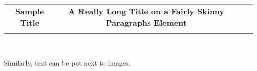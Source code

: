 \documentclass[10pt,]{article}
\theoremstyle{plain}
\theoremstyle{definition}
\theoremstyle{definition}
\theoremstyle{definition}
\theoremstyle{definition}
\theoremstyle{definition}
\theoremstyle{definition}
\numberwithin{equation}{section}
\newlength{\panelmax}
\begin{document}
{\setlength{\tabcolsep}{0.025\linewidth}
\par\medskip\noindent
\hspace*{0.025\linewidth}%
\begin{tabular}{@{}*{4}{c}@{}}
\parbox[t]{0.2\linewidth}{\centering{}\textbf{Sample Title}}&
\parbox[t]{0.2\linewidth}{\centering{}\textbf{A Really Long Title on a Fairly Skinny Paragraphs Element}}&
&
\tabularnewline
\begin{minipage}[c][\panelmax][c]{0.2\linewidth}\usebox{\panelboxAparagraphs}\end{minipage}&
\begin{minipage}[c][\panelmax][t]{0.2\linewidth}\usebox{\panelboxBparagraphs}\end{minipage}&
\begin{minipage}[c][\panelmax][c]{0.2\linewidth}\usebox{\panelboxEp}\end{minipage}&
\begin{minipage}[c][\panelmax][t]{0.2\linewidth}\usebox{\panelboxFp}\end{minipage}\end{tabular}\\
}%
\par
\hypertarget{p-674}{}%
Similarly, text can be put next to images.%
\end{document}
